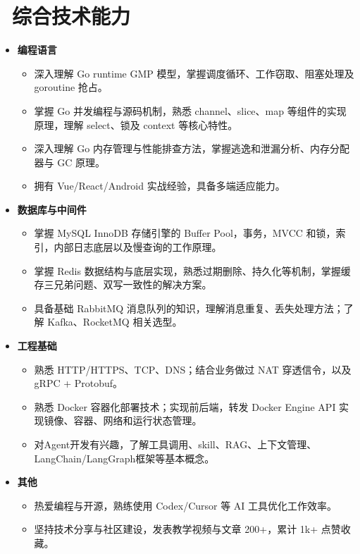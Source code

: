 \documentclass{resume}
\begin{document}
\section{\faCogs\ 综合技术能力}
\begin{itemize}
    \item \textbf{编程语言}
    \begin{itemize}
        \item 深入理解 Go runtime GMP 模型，掌握调度循环、工作窃取、阻塞处理及 goroutine 抢占。
        \item 掌握 Go 并发编程与源码机制，熟悉 channel、slice、map 等组件的实现原理，理解 select、锁及 context 等核心特性。
        \item 深入理解 Go 内存管理与性能排查方法，掌握逃逸和泄漏分析、内存分配器与 GC 原理。
        \item 拥有 Vue/React/Android 实战经验，具备多端适应能力。
    \end{itemize}

    \item \textbf{数据库与中间件}
    \begin{itemize}
        \item 掌握 MySQL InnoDB 存储引擎的 Buffer Pool，事务，MVCC 和锁，索引，内部日志底层以及慢查询的工作原理。
        \item 掌握 Redis 数据结构与底层实现，熟悉过期删除、持久化等机制，掌握缓存三兄弟问题、双写一致性的解决方案。
        \item 具备基础 RabbitMQ 消息队列的知识，理解消息重复、丢失处理方法；了解 Kafka、RocketMQ 相关选型。
    \end{itemize}
    
    \item \textbf{工程基础}
    \begin{itemize}
        \item 熟悉 HTTP/HTTPS、TCP、DNS；结合业务做过 NAT 穿透信令，以及 gRPC + Protobuf。
        \item 熟悉 Docker 容器化部署技术；实现前后端，转发 Docker Engine API 实现镜像、容器、网络和运行状态管理。
        \item 对Agent开发有兴趣，了解工具调用、skill、RAG、上下文管理、LangChain/LangGraph框架等基本概念。
    \end{itemize}

    \item \textbf{其他}
    \begin{itemize}
        \item 热爱编程与开源，熟练使用 Codex/Cursor 等 AI 工具优化工作效率。
        \item 坚持技术分享与社区建设，发表教学视频与文章 200+，累计 1k+ 点赞收藏。
    \end{itemize}
\end{itemize}
\end{document}
